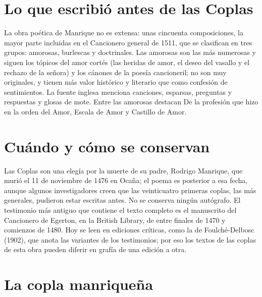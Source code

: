 \documentclass{book}
\begin{document}

\section{Lo que escribió antes de las Coplas}

La obra poética de Manrique no es extensa: unas cincuenta composiciones, la mayor parte incluidas en el Cancionero general de 1511, que se clasifican en tres grupos: amorosas, burlescas y doctrinales. Las amorosas son las más numerosas y siguen los tópicos del amor cortés (las heridas de amor, el deseo del vasallo y el rechazo de la señora) y los cánones de la poesía cancioneril; no son muy originales, y tienen más valor histórico y literario que como confesión de sentimientos. La fuente inglesa menciona canciones, esparsas, preguntas y respuestas y glosas de mote. Entre las amorosas destacan De la profesión que hizo en la orden del Amor, Escala de Amor y Castillo de Amor.


\section{Cuándo y cómo se conservan}

Las Coplas son una elegía por la muerte de su padre, Rodrigo Manrique, que murió el 11 de noviembre de 1476 en Ocaña; el poema es posterior a esa fecha, aunque algunos investigadores creen que las veinticuatro primeras coplas, las más generales, pudieron estar escritas antes. No se conserva ningún autógrafo. El testimonio más antiguo que contiene el texto completo es el manuscrito del Cancionero de Egerton, en la British Library, de entre finales de 1470 y comienzos de 1480. Hoy se leen en ediciones críticas, como la de Foulché-Delbosc (1902), que anota las variantes de los testimonios; por eso los textos de las coplas de esta obra pueden diferir en grafía de una edición a otra.


\section{La copla manriqueña}
\end{document}
